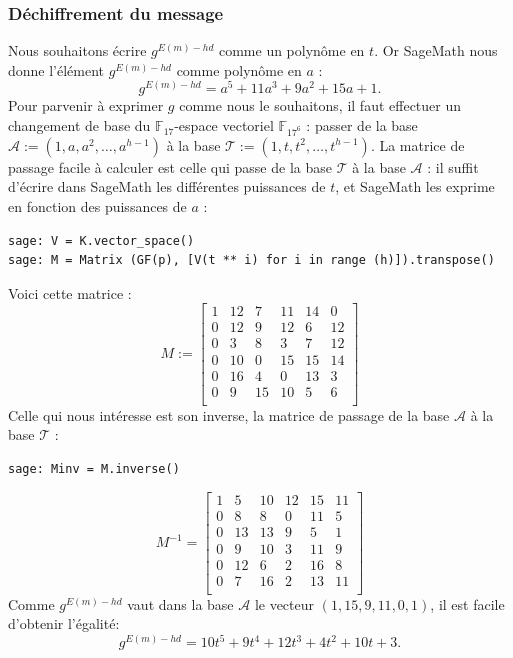 \documentclass[a4paper, titlepage, 11pt]{article}
\theoremstyle{definition}
\theoremstyle{remark}
\def\gf #1{\mathbb{F}_{#1}}
\begin{document}
\subsubsection{Déchiffrement du message}
Nous souhaitons écrire $g^{E(m) - hd}$ comme un polynôme en $t$. Or SageMath nous donne l'élément $g^{E(m) - hd}$ comme polynôme en $a$ : $$g^{E(m) - hd} = a^5 + 11a^3 + 9a^2 + 15a + 1.$$
Pour parvenir à exprimer $g$ comme nous le souhaitons, il faut effectuer un changement de base du $\gf{17}$-espace vectoriel $\gf{17^6}$ : passer de la base $\mathcal{A} := (1, a, a^2, \dots, a^{h-1})$ à la base $\mathcal{T} := (1, t, t^2, \dots, t^{h-1})$.
La matrice de passage facile à calculer est celle qui passe de la base $\mathcal{T}$ à la base $\mathcal{A}$ : il suffit d'écrire dans SageMath les différentes puissances de $t$, et SageMath les exprime en fonction des puissances de $a$ :
\begin{verbatim}
sage: V = K.vector_space()
sage: M = Matrix (GF(p), [V(t ** i) for i in range (h)]).transpose()
\end{verbatim}
Voici cette matrice :
$$M := \left[\begin{array}{cccccc}
1 & 12 & 7 & 11 & 14 & 0 \\
0 & 12 & 9 & 12 & 6 & 12 \\
0 & 3 & 8 & 3 & 7 & 12 \\
0 & 10 & 0 & 15 & 15 & 14 \\
0 & 16 & 4 & 0 & 13 & 3 \\
0 & 9 & 15 & 10 & 5 & 6 \\
\end{array}\right]$$
Celle qui nous intéresse est son inverse, la matrice de passage de la base $\mathcal{A}$ à la base $\mathcal{T}$ :
\begin{verbatim}
sage: Minv = M.inverse()
\end{verbatim}
$$M^{-1} = \left[\begin{array}{cccccc}
1 & 5 & 10 & 12 & 15 & 11 \\
0 & 8 & 8 & 0 & 11 & 5 \\
0 & 13 & 13 & 9 & 5 & 1 \\
0 & 9 & 10 & 3 & 11 & 9 \\
0 & 12 & 6 & 2 & 16 & 8 \\
0 & 7 & 16 & 2 & 13 & 11 \\
\end{array}\right]$$
Comme $g^{E(m) - hd}$ vaut dans la base $\mathcal{A}$ le vecteur $(1, 15, 9, 11, 0, 1)$, il est facile d'obtenir l'égalité:
$$g^{E(m) - hd} = 10t^5 + 9t^4 + 12t^3 + 4t^2 + 10t + 3.$$
\end{document}
